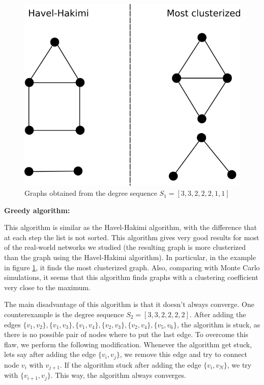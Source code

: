 \documentclass{article}
\begin{document}
\begin{figure}[h!]
\centering
\includegraphics[scale=0.8]{./figs/graph_3322211.png}
\caption{Graphs obtained from the degree sequence $S_1 = [3, 3, 2, 2, 2, 1, 1]$}
\label{fig:graph_3322211}
\end{figure}

{\bf Greedy algorithm:}

This algorithm is similar as the Havel-Hakimi algorithm, with the difference that at each step the list is not sorted. This algorithm gives very good results for most of the real-world networks we studied (the resulting graph is more clusterized than the graph using the Havel-Hakimi algorithm). In particular, in the example in figure \ref{fig:graph_3322211}, it finds the most clusterized graph. Also, comparing with Monte Carlo simulations, it seems that this algorithm finds graphs with a clustering coefficient very close to the maximum. 

The main disadvantage of this algorithm is that it doesn't always converge. One counterexample is the degree sequence $S_2 = [3, 3, 2, 2, 2, 2]$. After adding the edges $\lbrace v_1, v_2 \rbrace, \lbrace v_1, v_3 \rbrace, \lbrace v_1, v_4 \rbrace, \lbrace v_2, v_3 \rbrace, \lbrace v_2, v_4 \rbrace, \lbrace v_5, v_6 \rbrace$, the algorithm is stuck, as there is no possible pair of nodes where to put the last edge. To overcome this flaw, we  perform the following modification. Whenever the algorithm get stuck, lets say after adding the edge $\lbrace v_i, v_j \rbrace$, we remove this edge and try to connect node $v_i$ with $v_{j+1}$. If the algorithm stuck after adding the edge $\lbrace v_i, v_N \rbrace$, we try with $\lbrace v_{i+1}, v_j \rbrace$. This way, the algorithm always converges. 
\end{document}
